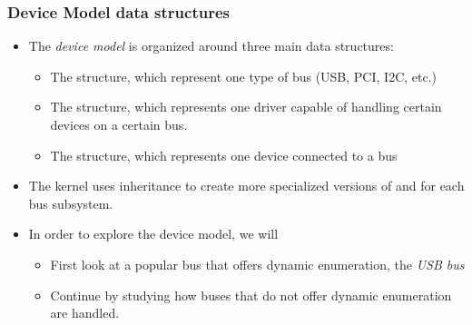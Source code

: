 \begin{frame}
  \frametitle{Device Model data structures}
  \begin{itemize}
  \item The {\em device model} is organized around three main data
    structures:
    \begin{itemize}
    \item The  structure, which represent one type of bus
      (USB, PCI, I2C, etc.)
    \item The  structure, which represents one driver
      capable of handling certain devices on a certain bus.
    \item The  structure, which represents one device
      connected to a bus
    \end{itemize}
  \item The kernel uses inheritance to create more specialized
    versions of  and 
    for each bus subsystem.
  \item In order to explore the device model, we will
    \begin{itemize}
    \item First look at a popular bus that offers dynamic enumeration,
      the {\em USB bus}
    \item Continue by studying how buses that do not offer dynamic
      enumeration are handled.
    \end{itemize}
  \end{itemize}
\end{frame}

